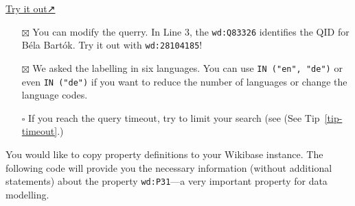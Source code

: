 \documentclass[
  letterpaper,
  DIV=11,
  numbers=noendperiod]{scrreprt}
\begin{document}
\href{https://query.wikidata.org/\#SELECT\%20DISTINCT\%20\%3FitemLabel\%20\%3FitemLabelLang\%20\%3FitemDescription\%20\%3FitemDescriptionLang\%20\%3Faliases\%20\%3FaliasesLang\%20WHERE\%20\%7B\%0A\%20\%20wd\%3AQ83326\%20rdfs\%3Alabel\%20\%3FitemLabel\%20\%3B\%0A\%20\%20\%20\%20\%20\%20\%20\%20\%20\%20\%20\%20schema\%3Adescription\%20\%3FitemDescription\%20.\%0A\%20\%20OPTIONAL\%20\%7B\%0A\%20\%20\%20\%20wd\%3AQ83326\%20skos\%3AaltLabel\%20\%3Faliases\%20.\%0A\%20\%20\%20\%20BIND\%28LANG\%28\%3Faliases\%29\%20AS\%20\%3FaliasesLang\%29\%0A\%20\%20\%7D\%0A\%20\%20BIND\%28LANG\%28\%3FitemLabel\%29\%20AS\%20\%3FitemLabelLang\%29\%0A\%20\%20BIND\%28LANG\%28\%3FitemDescription\%29\%20AS\%20\%3FitemDescriptionLang\%29\%0A\%20\%20FILTER\%28\%3FitemLabelLang\%20IN\%20\%28\%22en\%22\%2C\%20\%22de\%22\%2C\%20\%22hu\%22\%2C\%20\%22sk\%22\%2C\%20\%22lt\%22\%2C\%20\%22bg\%22\%29\%29\%0A\%20\%20FILTER\%28\%3FitemDescriptionLang\%20IN\%20\%28\%22en\%22\%2C\%20\%22de\%22\%2C\%20\%22hu\%22\%2C\%20\%22sk\%22\%2C\%20\%22lt\%22\%2C\%20\%22bg\%22\%29\%29\%0A\%20\%20FILTER\%28\%3FaliasesLang\%20IN\%20\%28\%22en\%22\%2C\%20\%22de\%22\%2C\%20\%22hu\%22\%2C\%20\%22sk\%22\%2C\%20\%22lt\%22\%2C\%20\%22bg\%22\%29\%29\%0A\%7D}{Try
it out↗}

\begin{itemize}
\item[$\boxtimes$]
  You can modify the querry. In Line 3, the \texttt{wd:Q83326}
  identifies the QID for Béla Bartók. Try it out with
  \texttt{wd:\textasciigrave{}\textasciigrave{}28104185}!
\item[$\boxtimes$]
  We asked the labelling in six languages. You can use
  \texttt{IN\ ("en",\ "de")} or even \texttt{IN\ ("de")} if you want to
  reduce the number of languages or change the language codes.
\item[$\square$]
  If you reach the query timeout, try to limit your search (see (See
  Tip~\ref{tip-timeout}.)
\end{itemize}

You would like to copy property definitions to your Wikibase instance.
The following code will provide you the necessary information (without
additional statements) about the property \texttt{wd:P31}---a very
important property for data modelling.
\end{document}
